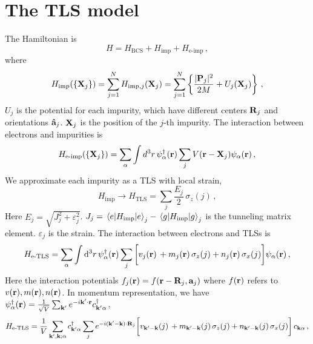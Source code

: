 \documentclass[]{article}
\begin{document}
\section{The TLS model}
The Hamiltonian is
\begin{equation}
    H=
    H_{\text{BCS}}
    +
    H_\text{imp}
    +
    H_\text{e-imp}
    \,,
\end{equation}
where
\begin{equation}
    H_\text{imp}(\{\vb{X}_j\}) = \sum_{j=1}^N H_{\text{imp},j}(\vb{X}_j)
    =
    \sum_{j=1}^{N}
    \left\{
    \frac{|\vb{P}_j|^2}{2M}
    +
    U_j(\vb{X}_j)
    \right\}
    \,,
\end{equation}
$U_j$ is the potential for each impurity, which have different centers $\vb{R}_j$ and orientations $\vu{a}_j$.
$\vb{X}_j$ is the position of the $j$-th impurity.
The interaction between electrons and impurities is
\begin{equation}
    H_\text{e-imp}(\{\vb{X}_j\})
    = 
    \sum_{\alpha}\int d^3r\,
    \psi^{\dag}_{\alpha}(\vb{r})
    \sum_{j}V(\vb{r}-\vb{X}_j)
    \psi_{\alpha}(\vb{r})
    \,,
    \label{eq-e-TLS}
\end{equation}
We approximate each impurity as a TLS with local strain,
\begin{equation}
    \label{eq-H_TLS}
    H_{\text{imp}} \rightarrow
    H_\text{TLS}=\sum_j\frac{E_j}{2}\,\sigma_z(j)
    \,,
\end{equation}
Here $E_j = \sqrt{J_j^2 + \varepsilon_j^2}$.
$J_j = \ev{H_\text{imp}}{e}_j - \ev{H_\text{imp}}{g}_j$ is the tunneling matrix element.
$\varepsilon_j$ is the strain.
The interaction between electrons and TLSs is
\begin{equation}
    H_\text{e-TLS}
    =
    \sum_{\alpha}\int\dd[3]r\,\psi^\dagger_{\alpha}(\vb{r})
    \sum_j
    \bigg[
    v_j(\vb{r})\,
    + 
    m_j(\vb{r})\,\sigma_{z}(j)
    + 
    n_j(\vb{r})\,\sigma_{x}(j)
    \bigg]
    \psi_{\alpha}(\vb{r})
    \,,
\end{equation}
Here the interaction potentials $f_j(\vb{r}) = f(\vb{r}-\vb{R}_j, \vb{a}_j)$ where $f(\vb{r})$ refers to $v(\vb{r}), m(\vb{r}), n(\vb{r})$.
In momentum representation, we have $\psi^\dagger_{\alpha}(\vb{r}) = \frac{1}{\sqrt{V}}\sum_{\vb{k}'}e^{-i\vb{k}'\cdot\vb{r}}c^\dagger_{\vb{k}'\alpha}$,
\begin{equation}\label{H_TLS}
    H_\text{e-TLS}
    = \frac{1}{V}
    \sum_{\vb{k}',\vb{k};\alpha}
    c^{\dag}_{\vb{k}'\alpha}\sum_{j}
    e^{-i(\vb{k}'-\vb{k})\cdot\vb{R}_j}
    \bigg[
    v_{\vb{k}'-\vb{k}}(j)\,
    +
    m_{\vb{k}'-\vb{k}}(j)\,\sigma_{z}(j)
    +
    n_{\vb{k}'-\vb{k}}(j)\,\sigma_{x}(j)
    \bigg]\,
    c_{\vb{k}\alpha}
    \,,
\end{equation}
\end{document}
